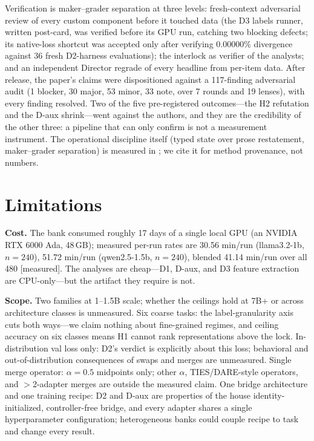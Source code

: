 \documentclass[10pt]{article}
\begin{document}
Verification is maker--grader separation at three levels: fresh-context
adversarial review of every custom component before it touched data (the
D3 labels runner, written post-card, was verified before its GPU run,
catching two blocking defects; its native-loss shortcut was accepted only
after verifying 0.00000\% divergence against 36 fresh D2-harness
evaluations); the interlock as verifier of the analysts; and an independent
Director regrade of every headline from per-item data. After release, the
paper's claims were dispositioned against a 117-finding adversarial audit
(1 blocker, 30 major, 53 minor, 33 note, over 7 rounds and 19 lenses), with
every finding resolved. Two of the five pre-registered outcomes---the H2
refutation and the D-aux shrink---went against the authors, and they are
the credibility of the other three: a pipeline that can only confirm is not
a measurement instrument. The operational discipline itself (typed state
over prose restatement, maker--grader separation) is measured in
\cite{bielec2026typedstate}; we cite it for method provenance, not numbers.

\section{Limitations}
\label{sec:limitations}

\textbf{Cost.} The bank consumed roughly 17 days of a single local GPU
(an NVIDIA RTX 6000 Ada, 48\,GB); measured per-run rates are 30.56 min/run
(llama3.2-1b, $n = 240$), 51.72 min/run (qwen2.5-1.5b, $n = 240$), blended
41.14 min/run over all 480 [measured]. The analyses are cheap---D1, D-aux,
and D3 feature extraction are CPU-only---but the artifact they require is
not.

\textbf{Scope.} Two families at 1--1.5B scale; whether the ceilings hold
at 7B+ or across architecture classes is unmeasured. Six coarse tasks: the
label-granularity axis cuts both ways---we claim nothing about fine-grained
regimes, and ceiling accuracy on six classes means H1 cannot rank
representations above the lock. In-distribution val loss only: D2's verdict
is explicitly about this loss; behavioral and out-of-distribution
consequences of swaps and merges are unmeasured. Single merge operator:
$\alpha = 0.5$ midpoints only; other $\alpha$, TIES/DARE-style operators,
and $>$2-adapter merges are outside the measured claim. One bridge
architecture and one training recipe: D2 and D-aux are properties of the
house identity-initialized, controller-free bridge, and every adapter
shares a single hyperparameter configuration; heterogeneous banks could
couple recipe to task and change every result.
\end{document}
